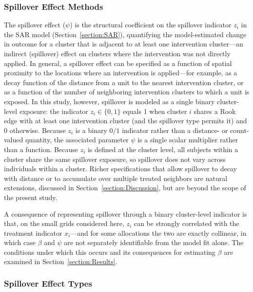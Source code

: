 \documentclass{article}[11pt]
\begin{document}
\subsubsection{Spillover Effect Methods}\label{Section:SpilloverEffectMethods}

The spillover effect ($\psi$) is the structural coefficient on the spillover indicator $z_i$ in the SAR model (Section~\ref{section:SAR}), quantifying the model-estimated change in outcome for a cluster that is adjacent to at least one intervention cluster---an indirect (spillover) effect on clusters where the intervention was not directly applied\cite{benjamin-chung_spillover_2017}\cite{benjamin-chung_extension_2024}. In general, a spillover effect can be specified as a function of spatial proximity to the locations where an intervention is applied---for example, as a decay function of the distance from a unit to the nearest intervention cluster, or as a function of the number of neighboring intervention clusters to which a unit is exposed. In this study, however, spillover is modeled as a single binary cluster-level exposure: the indicator $z_i \in \{0,1\}$ equals 1 when cluster $i$ shares a Rook edge with at least one intervention cluster (and the spillover type permits it) and 0 otherwise. Because $z_i$ is a binary $0/1$ indicator rather than a distance- or count-valued quantity, the associated parameter $\psi$ is a single scalar multiplier rather than a function. Because $z_i$ is defined at the cluster level, all subjects within a cluster share the same spillover exposure, so spillover does not vary across individuals within a cluster. Richer specifications that allow spillover to decay with distance or to accumulate over multiple treated neighbors are natural extensions, discussed in Section~\ref{section:Discussion}, but are beyond the scope of the present study.

A consequence of representing spillover through a binary cluster-level indicator is that, on the small grids considered here, $z_i$ can be strongly correlated with the treatment indicator $x_i$---and for some allocations the two are exactly collinear, in which case $\beta$ and $\psi$ are not separately identifiable from the model fit alone. The conditions under which this occurs and its consequences for estimating $\beta$ are examined in Section~\ref{section:Results}.

\subsubsection{Spillover Effect Types}\label{section:SpilloverEffectTypes}
\end{document}
